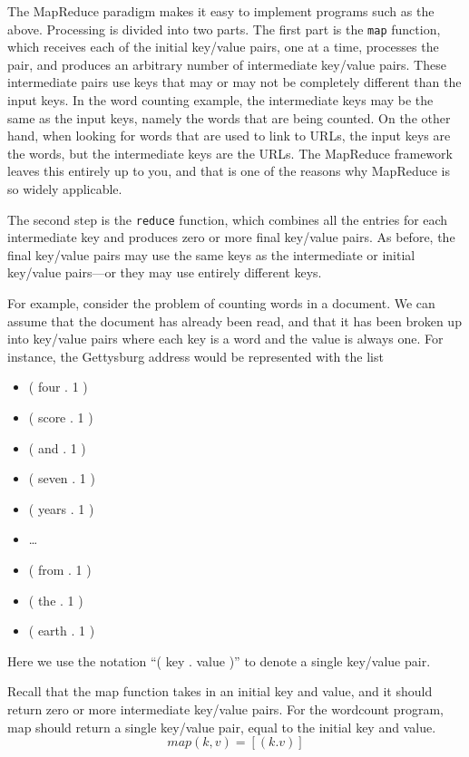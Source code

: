 The MapReduce paradigm makes it easy to implement programs
such as the above.  Processing is divided into two parts.  The
first part is the \texttt{map} function, which receives each
of the initial key/value pairs, one at a time, processes the
pair, and produces an arbitrary number of intermediate
key/value pairs.  These intermediate pairs use keys that may
or may not be completely different than the input keys.  In the
word counting example, the intermediate keys may be the same
as the input keys, namely the words that are being counted.
On the other hand, when looking for words that are used to
link to URLs, the input keys are the words, but the
intermediate keys are the URLs. The MapReduce framework leaves
this entirely up to you, and that is one of the reasons why
MapReduce is so widely applicable.

The second step is the \texttt{reduce} function, which
combines all the entries for each intermediate key and
produces zero or more final key/value pairs.  As before, the
final key/value pairs may use the same keys as the
intermediate or initial key/value pairs---or they may use
entirely different keys.

For example, consider the problem of counting words in a
document.  We can assume that the document has already been
read, and that it has been broken up into key/value pairs
where each key is a word and the value is always one.  For
instance, the Gettysburg address would be represented with the
list
\begin{itemize}
\item ( four . 1 )
\item ( score . 1 )
\item ( and . 1 )
\item ( seven . 1 )
\item ( years . 1 )
\item \dots
\item ( from . 1 )
\item ( the . 1 )
\item ( earth . 1 )
\end{itemize}
Here we use the notation ``( key . value )'' to denote a single
key/value pair.

Recall that the map function takes in an initial key and
value, and it should return zero or more intermediate
key/value pairs.  For the wordcount program, map should return
a single key/value pair, equal to the initial key and value.
\begin{displaymath}
map(k, v) = [ ( k . v ) ]
\end{displaymath}

